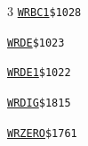 \begin{multicols}{3}
\noindent\hyperlink{l:WRBC1}{\texttt{WRBC1}}\hfill\texttt{\$1028~\phantom{000}\llap{\pageref{l:WRBC1}}}\par
\noindent\hyperlink{l:WRDE}{\texttt{WRDE}}\hfill\texttt{\$1023~\phantom{000}\llap{\pageref{l:WRDE}}}\par
\noindent\hyperlink{l:WRDE1}{\texttt{WRDE1}}\hfill\texttt{\$1022~\phantom{000}\llap{\pageref{l:WRDE1}}}\par
\noindent\hyperlink{l:WRDIG}{\texttt{WRDIG}}\hfill\texttt{\$1815~\phantom{000}\llap{\pageref{l:WRDIG}}}\par
\noindent\hyperlink{l:WRZERO}{\texttt{WRZERO}}\hfill\texttt{\$1761~\phantom{000}\llap{\pageref{l:WRZERO}}}\par
\end{multicols}
